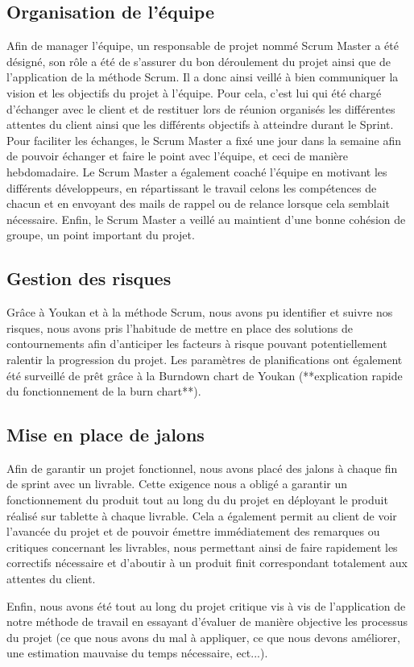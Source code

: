 \subsection{Organisation de l'équipe}

Afin de manager l'équipe, un responsable de projet nommé Scrum Master a été désigné, son rôle a été de s'assurer du bon déroulement du projet ainsi que de l'application de la méthode Scrum. Il a donc ainsi veillé à bien communiquer la vision et les objectifs du projet à l'équipe. Pour cela, c'est lui qui été chargé d'échanger avec le client et de restituer lors de réunion organisés les différentes attentes du client ainsi que les différents objectifs à atteindre durant le Sprint. Pour faciliter les échanges, le Scrum Master a fixé une jour dans la semaine afin de pouvoir échanger et faire le point avec l'équipe, et ceci de manière hebdomadaire. Le Scrum Master a également coaché l'équipe en motivant les différents développeurs, en répartissant le travail celons les compétences de chacun et en envoyant des mails de rappel ou de relance lorsque cela semblait nécessaire. Enfin, le Scrum Master a veillé au maintient d'une bonne cohésion de groupe, un point important du projet.

\subsection{Gestion des risques}

Grâce à Youkan et à la méthode Scrum, nous avons pu identifier et suivre nos risques, nous avons pris l'habitude de mettre en place des solutions de contournements afin d'anticiper les facteurs à risque pouvant potentiellement ralentir la progression du projet.
Les paramètres de planifications ont également été surveillé de prêt grâce à la Burndown chart de Youkan (**explication rapide du fonctionnement de la burn chart**).

\subsection{Mise en place de jalons}

Afin de garantir un projet fonctionnel, nous avons placé des jalons à chaque fin de sprint avec un livrable. Cette exigence nous a obligé a garantir un fonctionnement du produit tout au long du du projet en déployant le produit réalisé sur tablette à chaque livrable. Cela a également permit au client de voir l'avancée du projet et de pouvoir émettre immédiatement des remarques ou critiques concernant les livrables, nous permettant ainsi de faire rapidement les correctifs nécessaire et d'aboutir à un produit finit correspondant totalement aux attentes du client.  

Enfin, nous avons été tout au long du projet critique vis à vis de l'application de notre méthode de travail en essayant d'évaluer  de manière objective les processus du projet (ce que nous avons du mal à appliquer, ce que nous devons améliorer, une estimation mauvaise du temps nécessaire, ect...). 


